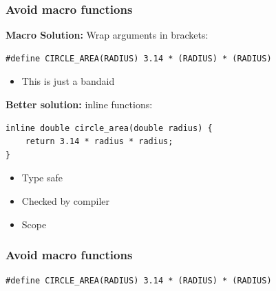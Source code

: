 \documentclass{beamer}
\begin{document}
\begin{frame}[fragile]
    \frametitle{\declarerule Avoid macro functions}
    \textbf{Macro Solution:} Wrap arguments in brackets:
\begin{lstlisting}
#define CIRCLE_AREA(RADIUS) 3.14 * (RADIUS) * (RADIUS)
\end{lstlisting}
\begin{itemize}
    \item This is just a bandaid
\end{itemize}
    \textbf{Better solution:} inline functions:
\begin{lstlisting}
inline double circle_area(double radius) {
    return 3.14 * radius * radius;
}
\end{lstlisting}
\begin{itemize}
    \item Type safe
    \item Checked by compiler
    \item Scope
\end{itemize}
\end{frame}

\begin{frame}[fragile]
    \frametitle{\declarerule Avoid macro functions}
\begin{lstlisting}
#define CIRCLE_AREA(RADIUS) 3.14 * (RADIUS) * (RADIUS)
\end{lstlisting}
\end{frame}
\end{document}
